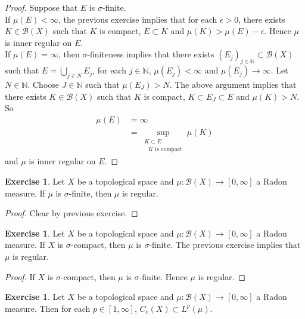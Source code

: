 \documentclass[12pt]{amsart}
\theoremstyle{definition}
\newtheorem{ex}[definition]{Exercise}
\newcommand{\ep}{\epsilon}
\newcommand{\sig}{\sigma}
\newcommand{\N}{\mathbb{N}}
\newcommand{\MB}{\mathcal{B}}
\newcommand{\RG}{[0,\infty]}
\newcommand{\lex}[1]{\label{ex:#1}}
\begin{document}
	\begin{proof}
	Suppose that $E$ is $\sig$-finite. \\
	If $\mu(E) < \infty$, the previous exercise implies that for each $\ep > 0 $, there exists $K \in \MB(X)$ such that $K$ is compact, $E \subset K$ and $\mu(K) > \mu(E) - \ep$. Hence $\mu$ is inner regular on $E$. \\
	If $\mu(E) = \infty$, then $\sig$-finiteness implies that there exists $(E_j)_{j \in \N} \subset \MB(X)$ such that $E = \bigcup\limits_{j \in N} E_j$, for each $j \in \N$, $\mu(E_j) < \infty$ and $\mu(E_j) \rightarrow \infty$. Let $N \in \N$. Choose $J \in \N$ such that $\mu(E_J) > N$. The above argument implies that there exists $K \in \MB(X)$ such that $K$ is compact, $K \subset E_J \subset E$ and $\mu(K) > N$. So 
	\begin{align*}
	\mu(E)
	&= \infty \\
	&= \sup_{\substack{ K \subset E \\ \text{ $K$ is compact}}} \mu(K)
	\end{align*}	 
and $\mu$ is inner regular on $E$.  
	\end{proof}		
	
	\begin{ex} \lex{00000} 
	Let $X$ be a topological space and $\mu: \MB(X) \rightarrow \RG$ a Radon measure. If $\mu$ is $\sig$-finite, then $\mu$ is regular.
	\end{ex}
	
	\begin{proof}
	Clear by previous exercise.
	\end{proof}
	
	\begin{ex} \lex{00000} 
	Let $X$ be a topological space and $\mu: \MB(X) \rightarrow \RG$ a Radon measure. If $X$ is $\sig$-compact, then $\mu$ is $\sig$-finite. The previous exercise implies that $\mu$ is regular. 
	\end{ex}
	
	\begin{proof}
	If $X$ is $\sig$-compact, then $\mu$ is $\sig$-finite. Hence $\mu$ is regular.
	\end{proof}
	
		
	
	\begin{ex} \lex{00000} 
	Let $X$ be a topological space and $\mu:\MB(X) \rightarrow \RG$ a Radon measure. Then for each $p \in [1, \infty]$, $C_c(X) \subset L^p(\mu)$.
	\end{ex}
	
\end{document}
